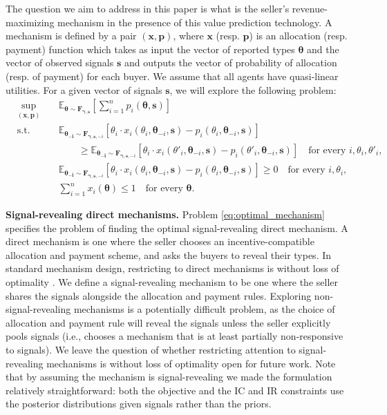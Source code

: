 The question we aim to address in this paper is what is the seller's revenue-maximizing mechanism in the presence of this value prediction technology. A mechanism is defined by a pair $(\bm{x},\bm{p})$, where $\bm{x}$ (resp. $\bm{p}$) is an allocation (resp. payment) function which takes as input the vector of reported types $\bm{\theta}$ and the vector of observed signals $\bm{s}$ and outputs the vector of probability of allocation (resp. of payment) for each buyer. We assume that all agents have quasi-linear utilities. For a given vector of signals $\bm{s}$, we will explore the following problem:
\begin{subequations}
\label{eq:optimal_mechanism}
\begin{alignat}{2}
&\!\sup_{(\bm{x},\bm{p})} &\;& \mathbb{E}_{\bm{\theta} \sim \bm{F_{\gamma,s}}} \left[  \sum_{i=1}^n  p_i(\bm{\theta},\bm{s}) \right]    \\
&\text{s.t.} &      &  \mathbb{E}_{\bm{\theta_{-i}} \sim \bm{F}_{\bm{\gamma},\bm{s},-i}} \left[ \theta_i \cdot x_i(\theta_i,\bm{\theta}_{-i},\bm{s}) - p_i(\theta_i,\bm{\theta}_{-i},\bm{s}) \right] \nonumber \\ 
 &  &  & \qquad \geq \mathbb{E}_{\bm{\theta_{-i}} \sim \bm{F}_{\bm{\gamma},\bm{s},-i}} \left[ \theta_i \cdot x_i(\theta'_i,\bm{\theta}_{-i},\bm{s}) - p_i(\theta'_i,\bm{\theta}_{-i},\bm{s}) \right] \quad \text{for every $i, \theta_i, \theta'_i$,} \label{eq:IC} \\
 &  &  &\mathbb{E}_{\bm{\theta_{-i}} \sim \bm{F}_{\bm{\gamma},\bm{s},-i}} \left[ \theta_i \cdot x_i(\theta_i,\bm{\theta}_{-i},\bm{s}) - p_i(\theta_i,\bm{\theta}_{-i},\bm{s}) \right] \geq 0 \quad \text{for every $i, \theta_i$,} \label{eq:IR}\\
& & & \sum_{i=1}^n x_i(\bm{\theta}) \leq 1 \quad \text{for every $\bm{\theta}$.}
\end{alignat}
\end{subequations}

 \noindent \textbf{Signal-revealing direct mechanisms.} Problem \eqref{eq:optimal_mechanism} specifies the problem of finding the optimal signal-revealing direct mechanism. A direct mechanism is one where the seller chooses an incentive-compatible allocation and payment scheme, and asks the buyers to reveal their types. In standard mechanism design, restricting to direct mechanisms is without loss of optimality \citep{myerson1981optimal}. We define a signal-revealing mechanism to be one where the seller shares the signals alongside the allocation and payment rules. Exploring non-signal-revealing mechanisms is a potentially difficult problem, as the choice of allocation and payment rule will reveal the signals unless the seller explicitly pools signals (i.e., chooses a mechanism that is at least partially non-responsive to signals). We leave the question of whether restricting attention to signal-revealing mechanisms is without loss of optimality open for future work. Note that by assuming the mechanism is signal-revealing we made the formulation relatively straightforward: both the objective and the IC and IR constraints use the posterior distributions given signals rather than the priors.\\

